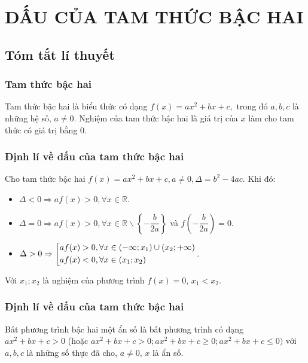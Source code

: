 \section{DẤU CỦA TAM THỨC BẬC HAI}
\subsection{Tóm tắt lí thuyết}

\subsubsection{Tam thức bậc hai}
\begin{dn}
	Tam thức bậc hai là biểu thức có dạng $f(x)  =  ax^2  +  bx  +  c,$ trong đó $a,b,c$ là những hệ số, $a\ne 0$. Nghiệm của tam thức bậc hai là giá trị của $x$ làm cho tam thức có giá trị bằng $0$.
\end{dn}
\subsubsection{Định lí về dấu của tam thức bậc hai}
\begin{dl}
	Cho tam thức bậc hai $f(x)  =  ax^2  +  bx  +  c,a\ne 0,\Delta  =  b^2  -  4ac$.
	Khi đó:
	\begin{itemize}
		\item $\Delta  <  0\Rightarrow af(x)  >  0,\forall x\in \mathbb{R}$.
		\item $ \Delta  =  0\Rightarrow af(x)  >  0,\forall x\in \mathbb{R}\backslash \left\{ -  \dfrac{b}{2a}\right\} $ và $f\left(-\dfrac{b}{2a}\right)=0$.
		\item $ \Delta  >  0\Rightarrow \left[\begin{aligned}
			& af(x)  >  0,\forall x\in (-\infty; x_1)\cup (x_2; +\infty) \\ 
			& af(x)  <  0,\forall x\in (x_1; x_2)\end{aligned}\right.$.
	\end{itemize}
	Với $x_1;x_2$ là nghiệm của phương trình $f(x)  =  0$, $x_1  <  x_2$.
	
\end{dl}
\subsubsection{Định lí về dấu của tam thức bậc hai}
\begin{dn}
	Bất phương trình bậc hai một ẩn số là bất phương trình có dạng $ax^2  +  bx  +  c  >  0$ (hoặc $ax^2  +  bx  +  c  >  0; ax^2  +  bx  +  c\ge 0; ax^2  +  bx  +  c\le 0)$ với $a,b,c$ là những số thực đã cho, $a\ne 0$, $x$ là ẩn số.
\end{dn}

